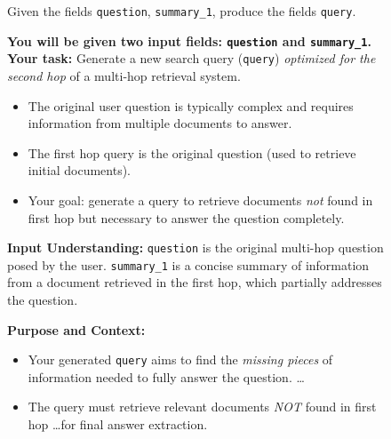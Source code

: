 \begin{figure}[!ht]
\centering
\begin{tcolorbox}[
    colback=promptbg!100!white,
    sharp corners=south, 
    boxrule=0.25mm, 
    fonttitle=\bfseries, 
    title={\textbf{Seed Prompt for Second-Hop of Multi-Hop QA System}}, 
    width=\textwidth, 
    enhanced,
    drop shadow
    ]
\scriptsize
\setlength{\parskip}{0pt}
\setlength{\itemsep}{0pt}

Given the fields \texttt{question}, \texttt{summary\_1}, produce the fields \texttt{query}.
\end{tcolorbox}

\begin{tcolorbox}[
    colback=promptbg!100!white, 
    sharp corners=south, 
    boxrule=0.3mm, 
    fonttitle=\bfseries, 
    title={\textbf{GEPA's Optimized Prompt for Second-Hop of Multi-Hop QA System, GPT-4.1 Mini}}, 
    width=\textwidth, 
    enhanced,
    drop shadow
    ]


\scriptsize
\textbf{You will be given two input fields: \texttt{question} and \texttt{summary\_1}.} \textbf{Your task:} Generate a new search query (\texttt{query}) \emph{optimized for the second hop} of a multi-hop retrieval system.

\begin{itemize}[left=0em]
    \item The original user question is typically complex and requires information from multiple documents to answer.
    \item The first hop query is the original question (used to retrieve initial documents).
    \item Your goal: generate a query to retrieve documents \emph{not} found in first hop but necessary to answer the question completely.
\end{itemize}

\vspace{1mm}
\textbf{Input Understanding:} \texttt{question} is the original multi-hop question posed by the user. \texttt{summary\_1} is a concise summary of information from a document retrieved in the first hop, which partially addresses the question.

\vspace{1mm}
\textbf{Purpose and Context:}
\begin{itemize}[left=0em]
    \item Your generated \texttt{query} aims to find the \emph{missing pieces} of information needed to fully answer the question. \ldots
    \item The query must retrieve relevant documents \emph{NOT} found in first hop \ldots for final answer extraction.
\end{itemize}


\end{tcolorbox}
\end{figure}
